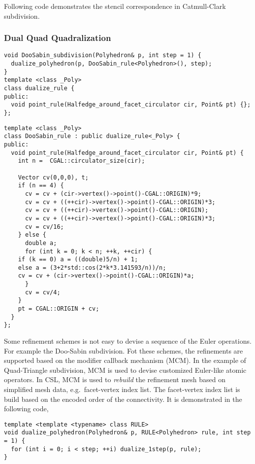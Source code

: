 Following code demonstrates the stencil correspondence in
Catmull-Clark subdivision.



\subsubsection{Dual Quad Quadralization}
\begin{lstlisting}
void DooSabin_subdivision(Polyhedron& p, int step = 1) {
  dualize_polyhedron(p, DooSabin_rule<Polyhedron>(), step);
}
template <class _Poly>
class dualize_rule {
public:
  void point_rule(Halfedge_around_facet_circulator cir, Point& pt) {};
};
\end{lstlisting}

\begin{lstlisting}
template <class _Poly>
class DooSabin_rule : public dualize_rule<_Poly> {
public:
  void point_rule(Halfedge_around_facet_circulator cir, Point& pt) {
    int n =  CGAL::circulator_size(cir); 

    Vector cv(0,0,0), t;
    if (n == 4) {
      cv = cv + (cir->vertex()->point()-CGAL::ORIGIN)*9;
      cv = cv + ((++cir)->vertex()->point()-CGAL::ORIGIN)*3;
      cv = cv + ((++cir)->vertex()->point()-CGAL::ORIGIN);
      cv = cv + ((++cir)->vertex()->point()-CGAL::ORIGIN)*3;
      cv = cv/16;
    } else {
      double a;
      for (int k = 0; k < n; ++k, ++cir) {
	if (k == 0) a = ((double)5/n) + 1;
	else a = (3+2*std::cos(2*k*3.141593/n))/n;
	cv = cv + (cir->vertex()->point()-CGAL::ORIGIN)*a;
      }
      cv = cv/4;
    }
    pt = CGAL::ORIGIN + cv;
  }
};
\end{lstlisting}

Some refinement schemes is not easy to devise a sequence
of the Euler operations. For example the Doo-Sabin subdivision.
Fot these schemes, the refinements are supported based on the
modifier callback mechanism (MCM). In the example of 
Quad-Triangle subdivision, MCM is used to devise 
customized Euler-like atomic operators.
In CSL, MCM is used to \emph{rebuild} the refinement
mesh based on simplified mesh data, e.g.\ facet-vertex index list.
The facet-vertex index list is build based on the encoded order
of the connectivity. It is demonstrated in the following code,

\begin{lstlisting}
template <template <typename> class RULE>
void dualize_polyhedron(Polyhedron& p, RULE<Polyhedron> rule, int step = 1) {
  for (int i = 0; i < step; ++i) dualize_1step(p, rule);
}
\end{lstlisting}


